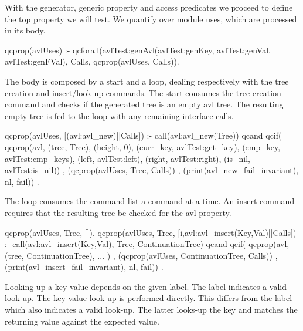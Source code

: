 With the generator, generic property and access predicates we proceed to
define the top property we will test.
%
We quantify over module uses, which are processed in its body.
%
\begin{yapcode}
 qcprop(avlUses) :-
   qcforall(avlTest:genAvl(avlTest:genKey,
              avlTest:genVal, avlTest:genFVal),
            Calls, qcprop({avlUses, Calls})).
\end{yapcode}
%
The body is composed by a start and a loop, dealing respectively with
the tree creation and insert/look-up commands.
%
The start consumes the tree creation command and checks if the generated
tree is an empty avl tree.
%
The resulting empty tree is fed to the loop with any remaining interface
calls.
%
\begin{yapcode}
 qcprop({avlUses, [(avl:avl_new)||Calls]}) :-
   call(avl:avl_new(Tree))
  qcand
   qcif(
     qcprop({avl, (tree, Tree), (height, 0),
                  (curr_key, avlTest:get_key),
                  (cmp_key, avlTest:cmp_keys),
                  (left, avlTest:left),
                  (right, avlTest:right),
                  (is_nil, avlTest:is_nil)})
   , (qcprop({avlUses, Tree, Calls}))
   , (print(avl_new_fail_invariant), nl, fail))
   .
\end{yapcode}
%
The loop consumes the command list a command at a time.
%
An insert command requires that the resulting tree be checked for the
avl property.
%
\begin{yapcode}
 qcprop({avlUses, Tree, []}).
 qcprop({avlUses, Tree,
      [{i,avl:avl_insert(Key,Val)}||Calls]}) :-
   call(avl:avl_insert(Key,Val),
        Tree, ContinuationTree)
     qcand
   qcif(
     qcprop({avl, (tree, ContinuationTree),
             ... })
   , (qcprop({avlUses, ContinuationTree, Calls}))
   , (print(avl_insert_fail_invariant),
      nl, fail))
   .
\end{yapcode}
%
Looking-up a key-value depends on the given label.
%
The label  indicates a valid look-up.
%
The key-value look-up is performed directly.
%
This differs from the label  which also indicates a valid
look-up.
%
The latter looks-up the key and matches the returning value against the
expected value.
